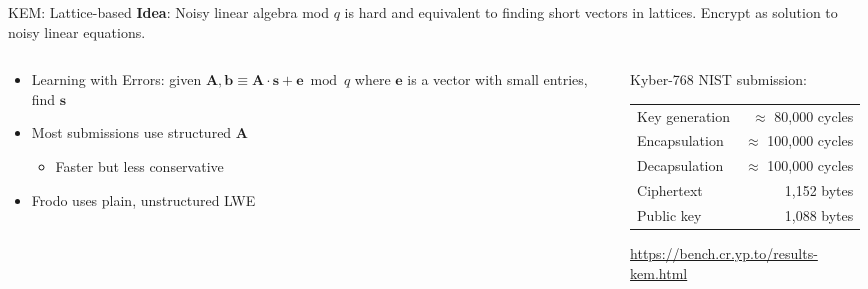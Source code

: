 \documentclass[xcolor=table,10pt,aspectratio=169]{beamer}
\begin{document}
\begin{frame}[label={sec:orgc593ec2}]{KEM: Lattice-based}
\textbf{Idea}: Noisy linear algebra mod \(q\) is hard and equivalent to finding short vectors in lattices. Encrypt as solution to noisy linear equations.

\begin{columns}[t]
\begin{column}{0.5\columnwidth}
\begin{itemize}
\item Learning with Errors: given \(\mathbf{A}, \mathbf{b} \equiv \mathbf{A} \cdot \mathbf{s} + \mathbf{e} \bmod q\) where \(\mathbf{e}\) is a vector with small entries, find \(\mathbf{s}\)
\item Most submissions use structured \(\mathbf{A}\)
\begin{itemize}
\item Faster but less conservative
\end{itemize}
\item Frodo uses plain, unstructured LWE
\end{itemize}
\end{column}

\begin{column}{0.5\columnwidth}
Kyber-768 NIST submission:

\begin{center}
\begin{tabular}{lr}
Key generation & \(\approx\)  80,000 cycles\\
Encapsulation & \(\approx\) 100,000 cycles\\
Decapsulation & \(\approx\) 100,000 cycles\\
Ciphertext & 1,152 bytes\\
Public key & 1,088 bytes\\
\end{tabular}

\end{center}

\small \url{https://bench.cr.yp.to/results-kem.html}
\end{column}
\end{columns}
\end{frame}
\end{document}
